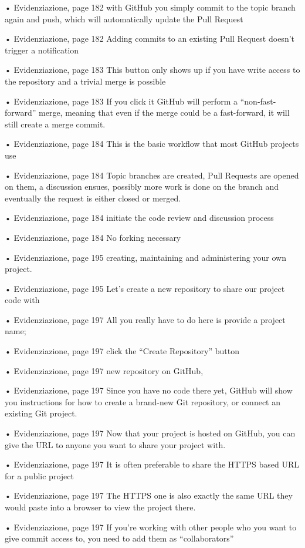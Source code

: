 • Evidenziazione, page 182
with GitHub you simply commit to the topic branch again and push, which will automatically update the Pull Request

• Evidenziazione, page 182
Adding commits to an existing Pull Request doesn’t trigger a notification

• Evidenziazione, page 183
This button only shows up if you have write access to the repository and a trivial merge is possible

• Evidenziazione, page 183
If you click it GitHub will perform a “non-fast-forward” merge, meaning that even if the merge could be a fast-forward, it will still create a merge commit.

• Evidenziazione, page 184
This is the basic workflow that most GitHub projects use

• Evidenziazione, page 184
Topic branches are created, Pull Requests are opened on them, a discussion ensues, possibly more work is done on the branch and eventually the request is either closed or merged.

• Evidenziazione, page 184
initiate the code review and discussion process

• Evidenziazione, page 184
No forking necessary

• Evidenziazione, page 195
creating, maintaining and administering your own project.

• Evidenziazione, page 195
Let’s create a new repository to share our project code with

• Evidenziazione, page 197
All you really have to do here is provide a project name;

• Evidenziazione, page 197
click the “Create Repository” button

• Evidenziazione, page 197
new repository on GitHub,

• Evidenziazione, page 197
Since you have no code there yet, GitHub will show you instructions for how to create a brand-new Git repository, or connect an existing Git project.

• Evidenziazione, page 197
Now that your project is hosted on GitHub, you can give the URL to anyone you want to share your project with.

• Evidenziazione, page 197
It is often preferable to share the HTTPS based URL for a public project

• Evidenziazione, page 197
The HTTPS one is also exactly the same URL they would paste into a browser to view the project there.

• Evidenziazione, page 197
If you’re working with other people who you want to give commit access to, you need to add them as “collaborators”


